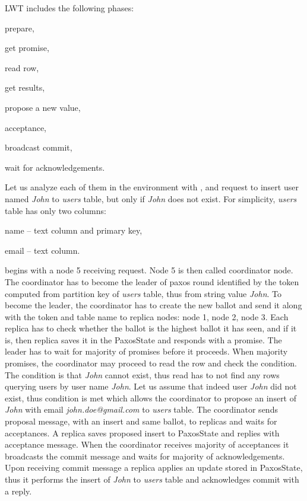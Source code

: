 LWT includes the following phases: \begin{enumerate*}
\item prepare,
\item get promise,
\item read row,
\item get results,
\item propose a new value,
\item acceptance,
\item broadcast commit,
\item wait for acknowledgements.
\end{enumerate*} 

Let us analyze each of them in the environment with ,  and request to insert user named \emph{John} to \emph{users} table, but only if \emph{John} does not exist. For simplicity, \emph{users} table has only two columns: \begin{enumerate*} 
\item name -- text column and primary key, \item email -- text column. \end{enumerate*} \lwt begins with a node 5 receiving request. Node 5 is then called coordinator node. The coordinator has to become the leader of paxos round identified by the token computed from partition key of \emph{users} table, thus from string value \emph{John}. To become the leader, the coordinator has to create the new ballot and send it along with the token and table name to replica nodes: node 1, node 2, node 3. Each replica has to check whether the ballot is the highest ballot it has seen, and if it is, then replica saves it in the PaxosState and responds with a promise. The leader has to wait for majority of promises before it proceeds. When majority promises, the coordinator may proceed to read the row and check the condition. The condition is that \emph{John} cannot exist, thus read has to not find any rows querying users by user name \emph{John}. Let us assume that indeed user \emph{John} did not exist, thus condition is met which allows the coordinator to propose an insert of \emph{John} with email \emph{john.doe@gmail.com} to \emph{users} table. The coordinator sends proposal message, with an insert and same ballot, to replicas and waits for acceptances. A replica saves proposed insert to PaxosState and replies with acceptance message.
When the coordinator receives majority of acceptances it broadcasts the commit message and waits for majority of acknowledgements. Upon receiving commit message a replica applies an update stored in PaxosState, thus it performs the insert of \emph{John} to \emph{users} table and acknowledges commit with a reply.

